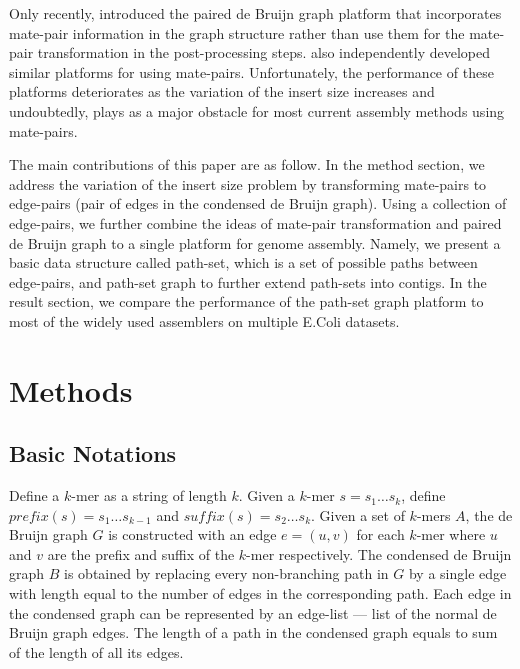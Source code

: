 \documentclass[12pt,a4paper,oneside]{article}
\begin{document}
Only recently, \cite{Medvedev11} introduced the paired de Bruijn graph platform that 
incorporates mate-pair information in the graph structure rather than use 
them for the mate-pair transformation in the post-processing steps. \cite{Donmez11,Chikhi11} also
independently developed similar platforms for using mate-pairs. 
Unfortunately, the performance of these platforms deteriorates as
the variation of the insert size increases and undoubtedly, plays as a major obstacle for 
most current assembly methods using mate-pairs. 




The main contributions of this paper are as follow. In the method section, we  address
the variation of the insert size problem by transforming mate-pairs to edge-pairs (pair
of edges in the condensed de Bruijn graph). Using a collection of edge-pairs, we further combine the ideas of 
mate-pair transformation and paired de Bruijn graph to a single platform for genome assembly.
Namely, we present a basic data structure called path-set, which is a set of possible paths between edge-pairs,
and path-set graph to further extend path-sets into contigs. In the result section, we compare the 
performance of the path-set graph platform to most of the widely used assemblers on multiple E.Coli datasets.




\section{Methods}
\subsection{Basic Notations}



Define a $k$-mer as a string of length  $k$. Given a $k$-mer $s=s_1\ldots s_k$, define 
$prefix(s) = s_1 \ldots s_{k-1}$  and $suffix(s) = s_2 \ldots s_k$. Given a set 
of $k$-mers $A$, the de  Bruijn graph $G$ is constructed with an edge $e=(u,v)$ for each $k$-mer
where $u$ and $v$ are the prefix and suffix of the $k$-mer respectively. The 
condensed de Bruijn graph $B$ is obtained by replacing every non-branching path in
$G$ by a single edge with length equal to the number of edges in the
corresponding path. Each edge in the condensed graph can be represented by an edge-list --- list of the normal de Bruijn graph edges. 
The length of a path in the condensed graph equals to sum of the length of all its edges. 
\end{document}
